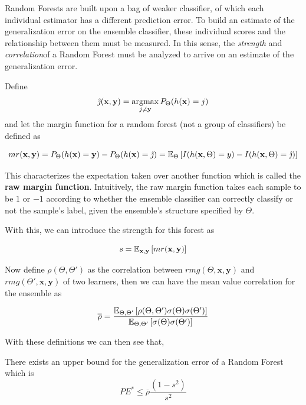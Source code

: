 Random Forests are built upon a bag of weaker classifier, of which each individual estimator has a different prediction error.
To build an estimate of the generalization error on the ensemble classifier, these individual scores and the relationship between them must be measured.
In this sense, the \textit{strength} and \textit{correlation}of a Random Forest must be analyzed to arrive on an estimate of the generalization error.


Define $$\hat{\jmath}( \textbf{x},\textbf{y}) = \operatorname*{argmax}_{j \neq \textbf{y}} P_{\Theta}(h(\textbf{x}) = j)$$ and let the margin function for a random forest (not a group of classifiers) be defined as

\[
mr(\textbf{x},\textbf{y}) = P_{\Theta}(h(\textbf{x}) = \textbf{y}) - P_{\Theta}(h(\textbf{x}) = \hat{\jmath})
\\
= \operatorname{\mathbb{E}}_{\Theta} \left[ I(h(\textbf{x},\Theta ) = y ) - I( h( \textbf{x},\Theta ) = \hat{\jmath} ) \right]
\]

This characterizes the expectation taken over another function which is called the \textbf{raw margin function}.
Intuitively, the raw margin function takes each sample to be $1$ or $-1$ according to whether the ensemble classifier can correctly classify or not the sample's label, given the ensemble's structure specified by $\Theta$.

With this, we can introduce the strength for this forest as

\begin{equation}
s = \operatorname{\mathbb{E}}_{\textbf{x},\textbf{y}} \left[ mr(\textbf{x},\textbf{y} ) \right]
\end{equation}

Now define $ \rho(\Theta, \Theta')$ as the correlation between $rmg(\Theta,\textbf{x},\textbf{y})$ and $rmg(\Theta',\textbf{x},\textbf{y})$ of two learners, then we can have the mean value correlation for the ensemble as

\begin{equation}
\overline{\rho} = \frac{\operatorname{\mathbb{E}}_{\Theta, \Theta'} \left[ \rho(\Theta, \Theta') \sigma(\Theta) \sigma(\Theta')\right]}
{\operatorname{\mathbb{E}}_{\Theta, \Theta'} \left[ \sigma(\Theta) \sigma(\Theta')\right]}
\end{equation}

With these definitions we can then see that,

\begin{theorem}
There exists an upper bound for the generalization error of a Random Forest which is    \begin{equation}
PE^* \leq \overline{\rho}\frac{(1-s^2)}{s^2}
\end{equation}
\end{theorem}

